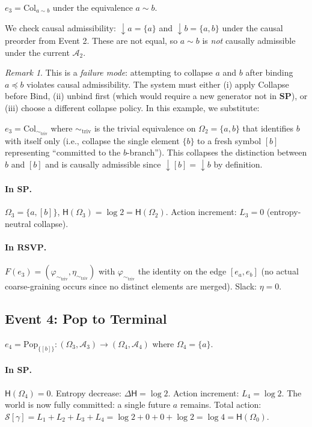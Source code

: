 \documentclass[12pt,a4paper]{article}
\theoremstyle{definition}
\theoremstyle{remark}
\newtheorem{remark}[theorem]{Remark}
\newcommand{\Ent}{\mathsf{H}}
\newcommand{\SP}{\mathbf{SP}}
\newcommand{\RSVP}{\mathbf{RSVP}}
\newcommand{\Pop}{\mathrm{Pop}}
\newcommand{\Col}{\mathrm{Col}}
\newcommand{\downset}[1]{\!\downarrow\!{#1}}
\begin{document}
$e_3=\Col_{a\sim b}$ under the equivalence $a\sim b$.

We check causal admissibility: $\downset{a}=\{a\}$ and $\downset{b}=\{a,b\}$ under
the causal preorder from Event 2. These are not equal, so $a\sim b$ is
\emph{not} causally admissible under the current $\mathcal{A}_2$.

\begin{remark}
This is a \emph{failure mode}: attempting to collapse $a$ and $b$ after binding
$a\preceq b$ violates causal admissibility. The system must either (i) apply Collapse
before Bind, (ii) unbind first (which would require a new generator not in $\SP$),
or (iii) choose a different collapse policy. In this example, we substitute:
\end{remark}

$e_3=\Col_{\sim_{\mathrm{triv}}}$ where $\sim_{\mathrm{triv}}$ is the trivial equivalence
on $\Omega_2=\{a,b\}$ that identifies $b$ with itself only (i.e., collapse the single
element $\{b\}$ to a fresh symbol $[b]$ representing ``committed to the $b$-branch'').
This collapses the distinction between $b$ and $[b]$ and is causally admissible since
$\downset{[b]}=\downset{b}$ by definition.

\paragraph{In $\SP$.}
$\Omega_3=\{a,[b]\}$, $\Ent(\Omega_3)=\log 2=\Ent(\Omega_2)$.
Action increment: $L_3=0$ (entropy-neutral collapse).

\paragraph{In $\RSVP$.}
$F(e_3)=(\varphi_{\sim_{\mathrm{triv}}},\eta_{\sim_{\mathrm{triv}}})$ with
$\varphi_{\sim_{\mathrm{triv}}}$ the identity on the edge $[e_a,e_b]$ (no actual
coarse-graining occurs since no distinct elements are merged). Slack: $\eta=0$.

\subsection{Event 4: Pop to Terminal}

$e_4=\Pop_{\{[b]\}}:(\Omega_3,\mathcal{A}_3)\to(\Omega_4,\mathcal{A}_4)$
where $\Omega_4=\{a\}$.

\paragraph{In $\SP$.}
$\Ent(\Omega_4)=0$. Entropy decrease: $\Delta\Ent=\log 2$. Action increment: $L_4=\log 2$.
The world is now fully committed: a single future $a$ remains. Total action: $\mathcal{S}[\gamma]
=L_1+L_2+L_3+L_4=\log 2+0+0+\log 2=\log 4=\Ent(\Omega_0)$.
\end{document}
